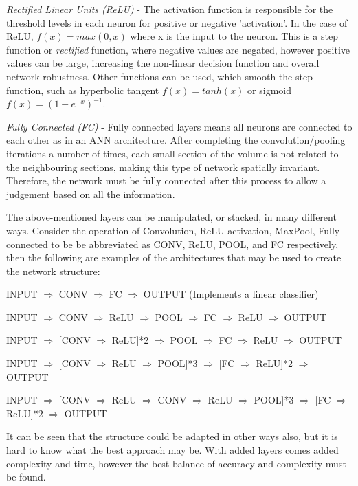 \documentclass[fleqn,twoside,12pt]{report}
\begin{document}
\textit{Rectified Linear Units (ReLU)} - The activation function is responsible for the threshold levels in each neuron for positive or negative 'activation'. In the case of ReLU, $f(x) = max(0, x)$ where x is the input to the neuron. This is a step function or \textit{rectified} function, where negative values are negated, however positive values can be large, increasing the non-linear decision function and overall network robustness. Other functions can be used, which smooth the step function, such as hyperbolic tangent $f(x) = tanh(x)$ or sigmoid $f(x) = (1+e^{-x})^{-1}$.

\textit{Fully Connected (FC)} - Fully connected layers means all neurons are connected to each other as in an ANN architecture. After completing the  convolution/pooling iterations a number of times, each small section of the volume is not related to the neighbouring sections, making this type of network spatially invariant. Therefore, the network must be fully connected after this process to allow a judgement based on all the information.

The above-mentioned layers can be manipulated, or stacked, in many different ways. Consider the operation of Convolution, ReLU activation, MaxPool, Fully connected to be be abbreviated as CONV, ReLU, POOL, and FC respectively, then the following are examples of the architectures that may be used to create the network structure:


INPUT $\Rightarrow$ CONV $\Rightarrow$ FC $\Rightarrow$ OUTPUT (Implements a linear classifier)

INPUT $\Rightarrow$ CONV $\Rightarrow$ ReLU $\Rightarrow$ POOL $\Rightarrow$ FC $\Rightarrow$ ReLU $\Rightarrow$ OUTPUT

INPUT $\Rightarrow$ [CONV $\Rightarrow$ ReLU]*2  $\Rightarrow$ POOL $\Rightarrow$ FC $\Rightarrow$ ReLU $\Rightarrow$ OUTPUT

INPUT $\Rightarrow$ [CONV $\Rightarrow$ ReLU $\Rightarrow$ POOL]*3  $\Rightarrow$ [FC $\Rightarrow$ ReLU]*2 $\Rightarrow$ OUTPUT

INPUT $\Rightarrow$ [CONV $\Rightarrow$ ReLU $\Rightarrow$ CONV $\Rightarrow$ ReLU $\Rightarrow$ POOL]*3  $\Rightarrow$ [FC $\Rightarrow$ ReLU]*2 $\Rightarrow$ OUTPUT

It can be seen that the structure could be adapted in other ways also, but it is hard to know what the best approach may be. With added layers comes added complexity and time, however the best balance of accuracy and complexity must be found.
\end{document}
